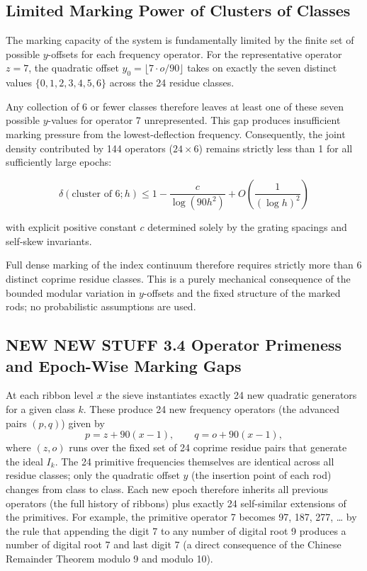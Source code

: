 \documentclass[11pt,a4paper]{article}
\begin{document}
{\subsection{Limited Marking Power of Clusters of Classes}

The marking capacity of the system is fundamentally limited by the finite set of possible \(y\)-offsets for each frequency operator. For the representative operator \(z=7\), the quadratic offset \(y_0=\lfloor 7\cdot o/90\rfloor\) takes on exactly the seven distinct values \(\{0,1,2,3,4,5,6\}\) across the 24 residue classes.

Any collection of 6 or fewer classes therefore leaves at least one of these seven possible \(y\)-values for operator 7 unrepresented. This gap produces insufficient marking pressure from the lowest-deflection frequency. Consequently, the joint density contributed by 144 operators (\(24\times6\)) remains strictly less than 1 for all sufficiently large epochs:


\[
\delta(\text{cluster of 6}; h) \le 1 - \frac{c}{\log(90h^2)} + O\left(\frac{1}{(\log h)^2}\right)
\]

with explicit positive constant \(c\) determined solely by the grating spacings and self-skew invariants.

Full dense marking of the index continuum therefore requires strictly more than 6 distinct coprime residue classes. This is a purely mechanical consequence of the bounded modular variation in \(y\)-offsets and the fixed structure of the marked rods; no probabilistic assumptions are used.


\subsection{NEW NEW STUFF 3.4 Operator Primeness and Epoch-Wise Marking Gaps}

At each ribbon level \(x\) the sieve instantiates exactly 24 new quadratic generators for a given class \(k\). These produce 24 new frequency operators (the advanced pairs \((p,q)\)) given by
\[
p = z + 90(x-1),\qquad q = o + 90(x-1),
\]
where \((z,o)\) runs over the fixed set of 24 coprime residue pairs that generate the ideal \(I_k\). The 24 primitive frequencies themselves are identical across all residue classes; only the quadratic offset \(y\) (the insertion point of each rod) changes from class to class. Each new epoch therefore inherits all previous operators (the full history of ribbons) plus exactly 24 self-similar extensions of the primitives. For example, the primitive operator 7 becomes 97, 187, 277, … by the rule that appending the digit 7 to any number of digital root 9 produces a number of digital root 7 and last digit 7 (a direct consequence of the Chinese Remainder Theorem modulo 9 and modulo 10).

}
\end{document}
